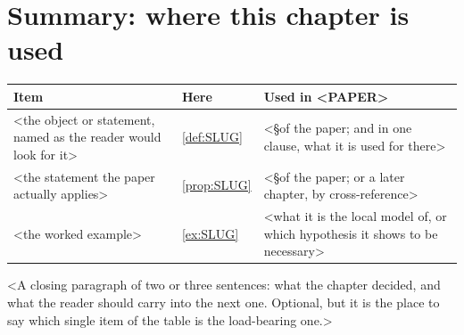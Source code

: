 \section{Summary: where this chapter is used}
\label{sec:SLUG-summary}

\begin{center}
\small
\begin{tabular}{@{}L{4.6cm}lL{5.9cm}@{}}
\toprule
Item & Here & Used in <PAPER> \\
\midrule
<the object or statement, named as the reader would look for it>
  & \ref{def:SLUG}
  & <\S of the paper; and in one clause, what it is used for there> \\
<the statement the paper actually applies>
  & \ref{prop:SLUG}
  & <\S of the paper; or a later chapter, by cross-reference> \\
<the worked example>
  & \ref{ex:SLUG}
  & <what it is the local model of, or which hypothesis it shows to be
    necessary> \\
\bottomrule
\end{tabular}
\end{center}

\noindent
<A closing paragraph of two or three sentences: what the chapter decided, and
what the reader should carry into the next one.  Optional, but it is the place
to say which single item of the table is the load-bearing one.>
